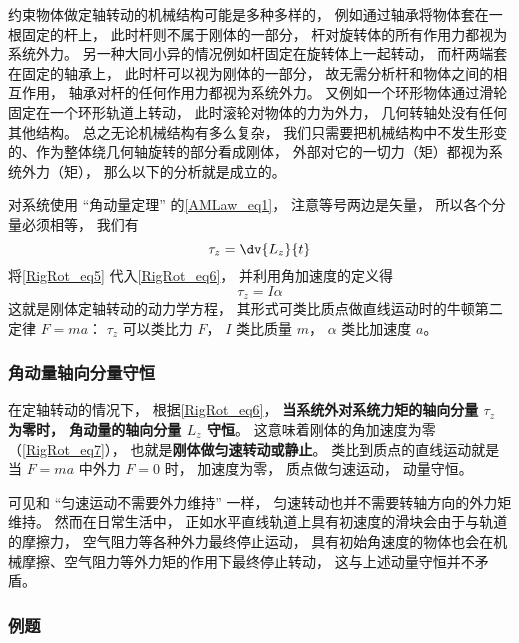 约束物体做定轴转动的机械结构可能是多种多样的， 例如通过轴承将物体套在一根固定的杆上， 此时杆则不属于刚体的一部分， 杆对旋转体的所有作用力都视为系统外力。 另一种大同小异的情况例如杆固定在旋转体上一起转动， 而杆两端套在固定的轴承上， 此时杆可以视为刚体的一部分， 故无需分析杆和物体之间的相互作用， 轴承对杆的任何作用力都视为系统外力。 又例如一个环形物体通过滑轮固定在一个环形轨道上转动， 此时滚轮对物体的力为外力， 几何转轴处没有任何其他结构。 总之无论机械结构有多么复杂， 我们只需要把机械结构中不发生形变的、作为整体绕几何轴旋转的部分看成刚体， 外部对它的一切力（矩）都视为系统外力（矩）， 那么以下的分析就是成立的。

对系统使用 “角动量定理” 的\autoref{AMLaw_eq1}， 注意等号两边是矢量， 所以各个分量必须相等， 我们有
\begin{equation}\label{RigRot_eq6}
\tau_z = \dv{L_z}{t}
\end{equation}
将\autoref{RigRot_eq5} 代入\autoref{RigRot_eq6}， 并利用角加速度的定义得
\begin{equation}\label{RigRot_eq7}
\tau_z = I\alpha
\end{equation}
这就是刚体定轴转动的动力学方程， 其形式可类比质点做直线运动时的牛顿第二定律 $F = ma$： $\tau_z$ 可以类比力 $F$， $I$ 类比质量 $m$， $\alpha$ 类比加速度 $a$。

\subsubsection{角动量轴向分量守恒}
在定轴转动的情况下， 根据\autoref{RigRot_eq6}， \textbf{当系统外对系统力矩的轴向分量 $\tau_z$ 为零时， 角动量的轴向分量 $L_z$ 守恒}。  这意味着刚体的角加速度为零（\autoref{RigRot_eq7}）， 也就是\textbf{刚体做匀速转动或静止}。 类比到质点的直线运动就是当 $F = ma$ 中外力 $F = 0$ 时， 加速度为零， 质点做匀速运动， 动量守恒。

可见和 “匀速运动不需要外力维持” 一样， 匀速转动也并不需要转轴方向的外力矩维持。 然而在日常生活中， 正如水平直线轨道上具有初速度的滑块会由于与轨道的摩擦力， 空气阻力等各种外力最终停止运动， 具有初始角速度的物体也会在机械摩擦、空气阻力等外力矩的作用下最终停止转动， 这与上述动量守恒并不矛盾。

\subsubsection{例题}

